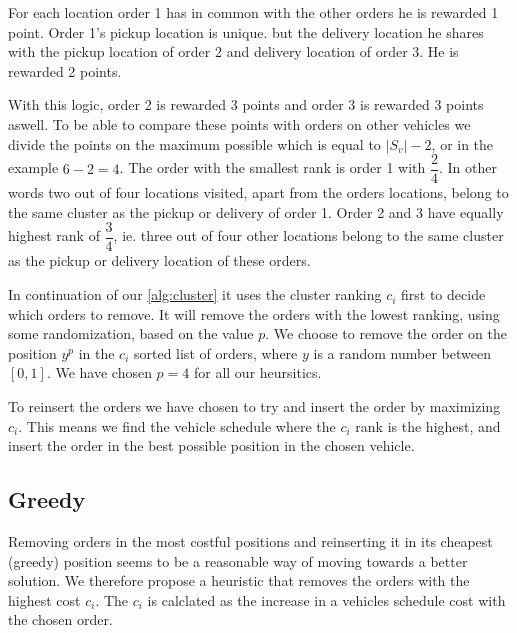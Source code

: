 \documentclass[../main.tex]{subfiles}
\begin{document}
For each location order 1 has in common with the other orders he is rewarded 1 point. Order 1's pickup location is unique. but the delivery location he shares with the pickup location of order 2 and delivery location of order 3. He is rewarded 2 points. \par
With this logic, order 2 is rewarded 3 points and order 3 is rewarded 3 points aswell.
To be able to compare these points with orders on other vehicles we divide the points on the maximum possible which is equal to $|S_v|-2$, or in the example $6-2 = 4$. 
The order with the smallest rank is order 1 with $\dfrac{2}{4}$. In other words two out of four locations visited, apart from the orders locations, belong to the same cluster as the pickup or delivery of order 1.
Order 2 and 3 have equally highest rank of $\dfrac{3}{4}$, ie. three out of four other locations belong to the same cluster as the pickup or delivery location of these orders. \par

In continuation of our \cref{alg:cluster} it uses the cluster ranking $c_i$ first to decide which orders to remove.
It will remove the orders with the lowest ranking, using some randomization, based on the value $p$. 
We choose to remove the order on the position $y^p$ in the $c_i$ sorted list of orders, where $y$ is a random number between $[0,1]$. We have chosen $p=4$ for all our heursitics.  \newline \par
To reinsert the orders we have chosen to try and insert the order by maximizing $c_i$. This means we find the vehicle schedule where the $c_i$ rank is the highest, and insert the order in the best possible position in the chosen vehicle. 

\subsection{Greedy}
\label{sec:greedy}
Removing orders in the most costful positions and reinserting it in its cheapest (greedy) position seems to be a reasonable way of moving towards a better solution.
We therefore propose a heuristic that removes the orders with the highest cost $c_{i}$.
The $c_i$ is calclated as the increase in a vehicles schedule cost with the chosen order.
\end{document}
